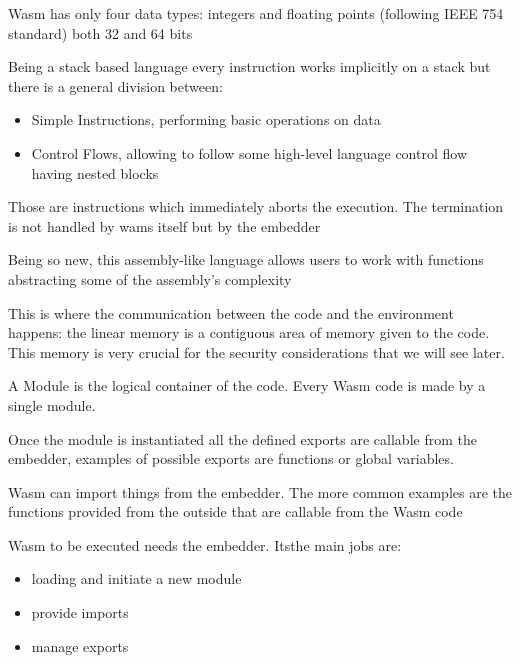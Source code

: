 \begin{description}[font=$\bullet$ \scshape\bfseries]
  \item[Values]
        Wasm has only four data types: integers and floating points (following IEEE 754 standard) both 32 and 64 bits
  \item[Instructions]
        Being a stack based language every instruction works implicitly on a stack but there is a general division between:
        \begin{itemize}
          \item Simple Instructions, performing basic operations on data
          \item Control Flows, allowing to follow some high-level language control flow having nested blocks
        \end{itemize}
  \item[Traps]
        Those are instructions which immediately aborts the execution. The termination is not handled by wams itself but by the embedder
  \item[Functions]
        Being so new, this assembly-like language allows users to work with functions abstracting some of the assembly's complexity
  \item[Linear Memory]
        This is where the communication between the code and the environment happens: the linear memory is a contiguous area of memory given to the code. This memory is very crucial for the security considerations that we will see later.
  \item[Modules]
        A Module is the logical container of the code. Every Wasm code is made by a single module.
  \item[Exports] Once the module is instantiated all the defined exports are callable from the embedder, examples of possible exports are functions or global variables.
  \item[Imports] Wasm can import things from the embedder. The more common examples are the functions provided from the outside that are callable from the Wasm code
  \item[Embedder]
        Wasm to be executed needs the embedder. Itsthe main jobs are:
        \begin{itemize}
          \item loading and initiate a new module
          \item provide imports
          \item manage exports
        \end{itemize}
\end{description}

